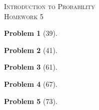 \documentclass{article}
\theoremstyle{problem}
\newtheorem{prob}{Problem}
\begin{document}
\begin{center}
  \textsc{\Large Introduction to Probability}\\[.3cm]
  \textsc{\Large Homework 5}
\end{center}

\begin{prob}[39]

\end{prob}
%
\begin{prob}[41]

\end{prob}
%
\begin{prob}[61]

\end{prob}
%
\begin{prob}[67]

\end{prob}
%
\begin{prob}[73]

\end{prob}
%
\end{document}
